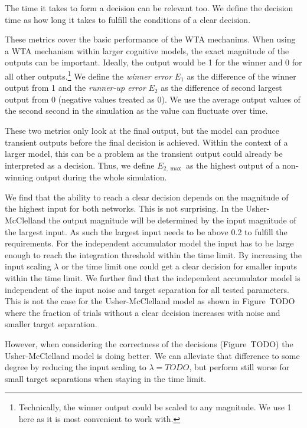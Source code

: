 \documentclass[10pt,letterpaper]{article}
\begin{document}
The time it takes to form a decision can be relevant too. We define the decision 
time as how long it takes to fulfill the conditions of a clear decision.

These metrics cover the basic performance of the WTA mechanims. When using a WTA 
mechanism within larger cognitive models, the exact magnitude of the outputs can 
be important. Ideally, the output would be 1 for the winner and 0 for all other 
outputs.\footnote{Technically, the winner output could be scaled to any 
    magnitude. We use 1 here as it is most convenient to work with.} We define 
the \emph{winner error} $E_1$ as the difference of the winner output from 1 and 
the \emph{runner-up error} $E_2$ as the difference of second largest output from 
0 (negative values treated as 0). We use the average output values of the second 
  second in the simulation as the value can fluctuate over time.

These two metrics only look at the final output, but the model can produce 
transient outputs before the final decision is achieved. Within the context of 
a larger model, this can be a problem as the transient output could already be 
interpreted as a decision. Thus, we define $E_{2,\max}$ as the highest output of 
a non-winning output during the whole simulation.


We find that the ability to reach a clear decision depends on the magnitude of 
the highest input for both networks. This is not surprising. In the 
Usher-McClelland the output magnitude will be determined by the input magnitude 
of the largest input. As such the largest input needs to be above 0.2 to fulfill 
the requirements. For the independent accumulator model the input has to be 
large enough to reach the integration threshold within the time limit. By 
increasing the input scaling $\lambda$ or the time limit one could get a clear 
decision for smaller inputs within the time limit. We further find that the 
independent accumulator model is independent of the input noise and target 
separation for all tested parameters. This is not the case for the 
Usher-McClelland model as shown in Figure~TODO where the fraction of trials 
without a clear decision increases with noise and smaller target separation.

However, when considering the correctness of the decisions (Figure~TODO) the 
Usher-McClelland model is doing better. We can alleviate that difference to some 
degree by reducing the input scaling to $\lambda = TODO$, but perform still 
worse for small target separations when staying in the time limit.
\end{document}
